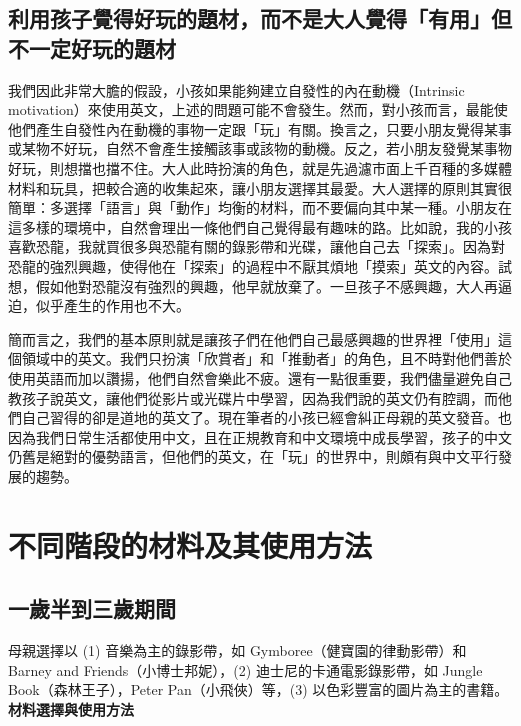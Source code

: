 \documentclass[12pt, a4paper]{article}
\begin{document}
\subsection{利用孩子覺得好玩的題材，而不是大人覺得「有用」但不一定好玩的題材}
我們因此非常大膽的假設，小孩如果能夠建立自發性的內在動機（Intrinsic motivation）來使用英文，上述的問題可能不會發生。然而，對小孩而言，最能使他們產生自發性內在動機的事物一定跟「玩」有關。換言之，只要小朋友覺得某事或某物不好玩，自然不會產生接觸該事或該物的動機。反之，若小朋友發覺某事物好玩，則想擋也擋不住。大人此時扮演的角色，就是先過濾市面上千百種的多媒體材料和玩具，把較合適的收集起來，讓小朋友選擇其最愛。大人選擇的原則其實很簡單：多選擇「語言」與「動作」均衡的材料，而不要偏向其中某一種。小朋友在這多樣的環境中，自然會理出一條他們自己覺得最有趣味的路。比如說，我的小孩喜歡恐龍，我就買很多與恐龍有關的錄影帶和光碟，讓他自己去「探索」。因為對恐龍的強烈興趣，使得他在「探索」的過程中不厭其煩地「摸索」英文的內容。試想，假如他對恐龍沒有強烈的興趣，他早就放棄了。一旦孩子不感興趣，大人再逼迫，似乎產生的作用也不大。

簡而言之，我們的基本原則就是讓孩子們在他們自己最感興趣的世界裡「使用」這個領域中的英文。我們只扮演「欣賞者」和「推動者」的角色，且不時對他們善於使用英語而加以讚揚，他們自然會樂此不疲。還有一點很重要，我們儘量避免自己教孩子說英文，讓他們從影片或光碟片中學習，因為我們說的英文仍有腔調，而他們自己習得的卻是道地的英文了。現在筆者的小孩已經會糾正母親的英文發音。也因為我們日常生活都使用中文，且在正規教育和中文環境中成長學習，孩子的中文仍舊是絕對的優勢語言，但他們的英文，在「玩」的世界中，則頗有與中文平行發展的趨勢。

\section{不同階段的材料及其使用方法}
\subsection{一歲半到三歲期間}
母親選擇以 (1) 音樂為主的錄影帶，如 Gymboree（健寶園的律動影帶）和 Barney and Friends（小博士邦妮），(2) 迪士尼的卡通電影錄影帶，如 Jungle Book（森林王子），Peter Pan（小飛俠）等，(3) 以色彩豐富的圖片為主的書籍。\\

\textbf{材料選擇與使用方法} %
\end{document}
